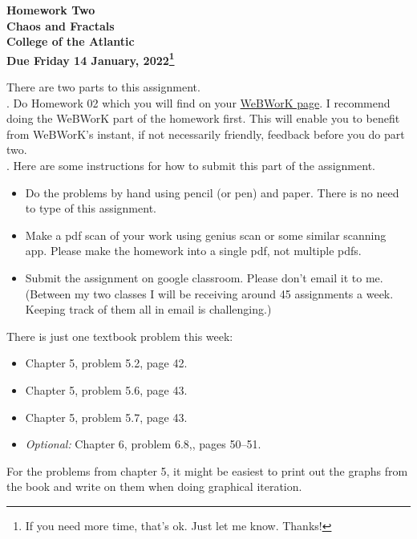 \documentclass[12pt]{article}
\begin{document}
\pagestyle{empty}
 
\begin{center}
{\LARGE {\bf Homework Two}}\\
\bigskip
{\Large {\bf Chaos and Fractals}}\\
\bigskip
{\Large {\bf College of the Atlantic}}\\
\bigskip
{ {\bf Due Friday 14 January, 2022\footnote{If you need more time,
      that's ok. Just let me know. Thanks!}}}\\  
\end{center}
\medskip


\noindent There are two parts to this assignment.\\

.  Do Homework 02 which you will find
on your
\href{https://webwork.runestone.academy/webwork2/coa-feldman-es1026i-winter-2022/}{WeBWorK
  page}.  I recommend doing the WeBWorK part of the 
homework first.  This will enable you to benefit from WeBWorK's
instant, if not necessarily friendly, feedback before you do part two.\\

.  Here are some
instructions for how to submit this part of the assignment.
\begin{itemize}
\item Do the problems by hand using pencil (or pen) and paper.
  There is no need to type of this assignment.
\item Make a pdf scan of your work using genius scan or some
  similar scanning app.  Please make the homework into a single
  pdf, not multiple pdfs.
\item Submit the assignment on google classroom.  Please don't
  email it to me.  (Between my two classes I will be receiving
  around 45 assignments a week.  Keeping track of them all in email
  is challenging.)
\end{itemize}

\noindent There is just one textbook problem this week:

\begin{itemize}
\setlength{\itemsep}{-1mm}
\item Chapter 5, problem 5.2, page 42.
\item Chapter 5, problem 5.6, page 43.
\item Chapter 5, problem 5.7, page 43.
\item \emph{Optional:} Chapter 6, problem 6.8,, pages 50--51. 
\end{itemize}

For the problems from chapter 5, it might be easiest to print out the
graphs from the book and write on them when doing graphical
iteration. 
\end{document}
